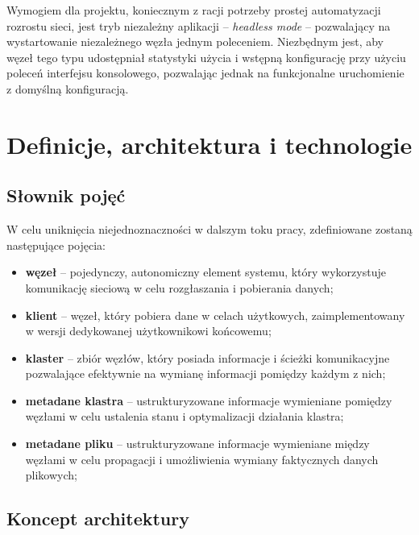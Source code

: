 Wymogiem dla projektu, koniecznym z racji potrzeby prostej automatyzacji rozrostu sieci, jest tryb niezależny aplikacji -- {\em headless mode} -- pozwalający na wystartowanie niezależnego węzła jednym poleceniem. Niezbędnym jest, aby węzeł tego typu udostępniał statystyki użycia i wstępną konfigurację przy użyciu poleceń interfejsu konsolowego, pozwalając jednak na funkcjonalne uruchomienie z domyślną konfiguracją.


\section{Definicje, architektura i technologie}
\label{sec:zalozeniaProjektu}

\subsection{Słownik pojęć}

W celu uniknięcia niejednoznaczności w dalszym toku pracy, zdefiniowane zostaną następujące pojęcia:

\begin{itemize}
    \item \textbf{węzeł} -- pojedynczy, autonomiczny element systemu, który wykorzystuje komunikację sieciową w celu rozgłaszania i pobierania danych;
    \item \textbf{klient} -- węzeł, który pobiera dane w celach użytkowych, zaimplementowany w wersji dedykowanej użytkownikowi końcowemu;
    \item \textbf{klaster} -- zbiór węzłów, który posiada informacje i ścieżki komunikacyjne pozwalające efektywnie na wymianę informacji pomiędzy każdym z nich;
    \item \textbf{metadane klastra} -- ustrukturyzowane informacje wymieniane pomiędzy węzłami w celu ustalenia stanu i optymalizacji działania klastra;
    \item \textbf{metadane pliku} -- ustrukturyzowane informacje wymieniane między węzłami w celu propagacji i umożliwienia wymiany faktycznych danych plikowych;
  \end{itemize}

\subsection{Koncept architektury}

